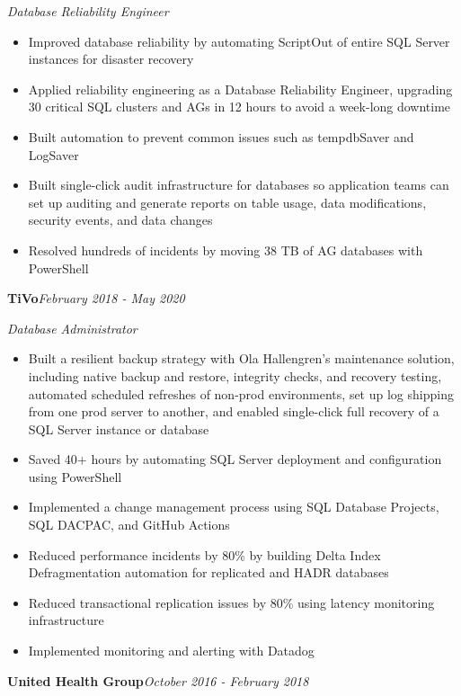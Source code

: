 \documentclass[10pt,a4paper]{article}
\begin{document}
\textit{Database Reliability Engineer}\\[-5pt]
\begin{itemize}
  \item Improved database reliability by automating ScriptOut of entire SQL Server instances for disaster recovery
  \item Applied reliability engineering as a Database Reliability Engineer, upgrading 30 critical SQL clusters and AGs in 12 hours to avoid a week-long downtime
  \item Built automation to prevent common issues such as tempdbSaver and LogSaver
  \item Built single-click audit infrastructure for databases so application teams can set up auditing and generate reports on table usage, data modifications, security events, and data changes
  \item Resolved hundreds of incidents by moving 38 TB of AG databases with PowerShell
\end{itemize}
\vspace{14.7pt}
\noindent\textbf{TiVo}\hfill \textit{February 2018 - May 2020}

\textit{Database Administrator}\\[-5pt]
\begin{itemize}
  \item Built a resilient backup strategy with Ola Hallengren's maintenance solution, including native backup and restore, integrity checks, and recovery testing, automated scheduled refreshes of non-prod environments, set up log shipping from one prod server to another, and enabled single-click full recovery of a SQL Server instance or database
  \item Saved 40+ hours by automating SQL Server deployment and configuration using PowerShell
  \item Implemented a change management process using SQL Database Projects, SQL DACPAC, and GitHub Actions
  \item Reduced performance incidents by 80\% by building Delta Index Defragmentation automation for replicated and HADR databases
  \item Reduced transactional replication issues by 80\% using latency monitoring infrastructure
  \item Implemented monitoring and alerting with Datadog
\end{itemize}
\vspace{14.7pt}
\noindent\textbf{United Health Group}\hfill \textit{October 2016 - February 2018}
\end{document}
